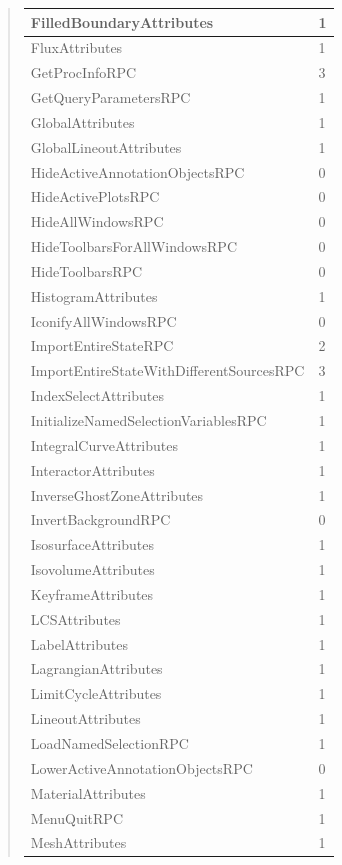 \documentclass[letterpaper,10pt,english]{sphinxmanual}
\begin{document}
\begin{quote}
\begin{longtable}{|l|l|}
\hline
FilledBoundaryAttributes
 & 
1
\\
\hline
FluxAttributes
 & 
1
\\
\hline
GetProcInfoRPC
 & 
3
\\
\hline
GetQueryParametersRPC
 & 
1
\\
\hline
GlobalAttributes
 & 
1
\\
\hline
GlobalLineoutAttributes
 & 
1
\\
\hline
HideActiveAnnotationObjectsRPC
 & 
0
\\
\hline
HideActivePlotsRPC
 & 
0
\\
\hline
HideAllWindowsRPC
 & 
0
\\
\hline
HideToolbarsForAllWindowsRPC
 & 
0
\\
\hline
HideToolbarsRPC
 & 
0
\\
\hline
HistogramAttributes
 & 
1
\\
\hline
IconifyAllWindowsRPC
 & 
0
\\
\hline
ImportEntireStateRPC
 & 
2
\\
\hline
ImportEntireStateWithDifferentSourcesRPC
 & 
3
\\
\hline
IndexSelectAttributes
 & 
1
\\
\hline
InitializeNamedSelectionVariablesRPC
 & 
1
\\
\hline
IntegralCurveAttributes
 & 
1
\\
\hline
InteractorAttributes
 & 
1
\\
\hline
InverseGhostZoneAttributes
 & 
1
\\
\hline
InvertBackgroundRPC
 & 
0
\\
\hline
IsosurfaceAttributes
 & 
1
\\
\hline
IsovolumeAttributes
 & 
1
\\
\hline
KeyframeAttributes
 & 
1
\\
\hline
LCSAttributes
 & 
1
\\
\hline
LabelAttributes
 & 
1
\\
\hline
LagrangianAttributes
 & 
1
\\
\hline
LimitCycleAttributes
 & 
1
\\
\hline
LineoutAttributes
 & 
1
\\
\hline
LoadNamedSelectionRPC
 & 
1
\\
\hline
LowerActiveAnnotationObjectsRPC
 & 
0
\\
\hline
MaterialAttributes
 & 
1
\\
\hline
MenuQuitRPC
 & 
1
\\
\hline
MeshAttributes
 & 
1
\\

\end{longtable}
\end{quote}
\end{document}

